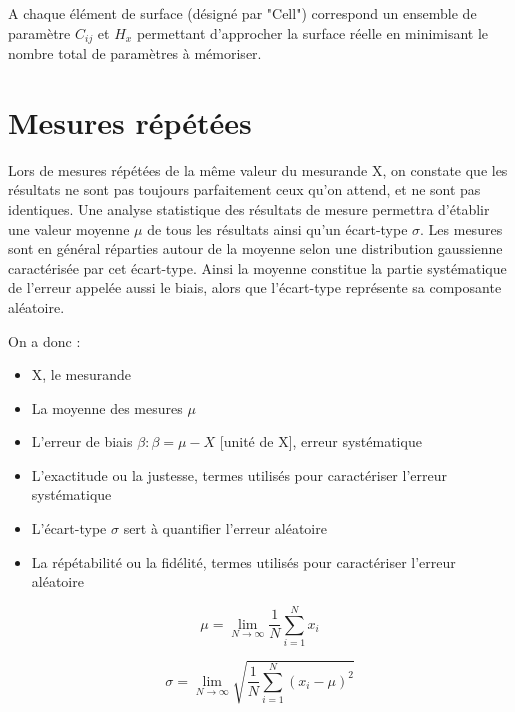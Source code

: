 A chaque élément de surface (désigné par "Cell") correspond un ensemble de paramètre $C_{ij}$ et $H_x$ permettant d'approcher la surface réelle en minimisant le nombre total de paramètres à mémoriser.

\section{Mesures répétées}

Lors de mesures répétées de la même valeur du mesurande X, on constate que les résultats ne sont pas toujours parfaitement ceux qu'on attend, et ne sont pas identiques. Une analyse statistique des résultats de mesure permettra d'établir une valeur moyenne $\mu$ de tous les résultats ainsi qu'un écart-type $\sigma$. Les mesures sont en général réparties autour de la moyenne selon une distribution gaussienne caractérisée par cet écart-type. Ainsi la moyenne constitue la partie systématique de l'erreur appelée aussi le biais, alors que l'écart-type représente sa composante aléatoire.

\newpage
On a donc :
\begin{itemize}\itemsep1pt
\renewcommand{\labelitemi}{$\bullet$}
\item X, le mesurande
\item La moyenne des mesures $\mu$
\item L'erreur de biais $\beta :  \beta = \mu - X$  [unité de X], erreur systématique
\item L'exactitude ou la justesse, termes utilisés pour caractériser l'erreur systématique
\item L'écart-type $\sigma$ sert à quantifier l'erreur aléatoire
\item La répétabilité ou la fidélité, termes utilisés pour caractériser l'erreur aléatoire
\end{itemize}

\begin{equation}
\mu = \lim\limits_{N \to \infty} \frac{1}{N} \sum_{i=1}^N x_i
\end{equation}

\begin{equation}
\sigma = \lim\limits_{N \to \infty} \sqrt{\frac{1}{N}\sum_{i=1}^N (x_i-\mu)^2}
\end{equation}


